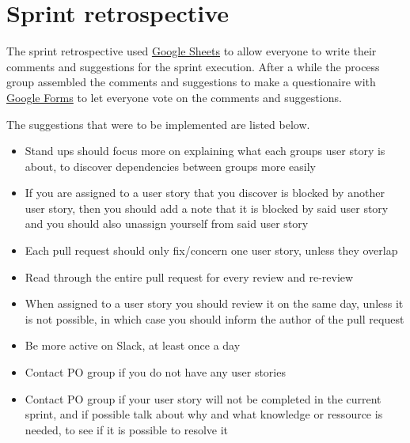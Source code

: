 \section{Sprint retrospective}
The sprint retrospective used \href{https://www.google.com/sheets/about/}{Google Sheets} to allow everyone to write their comments and suggestions for the sprint execution.
After a while the process group assembled the comments and suggestions to make a questionaire with \href{https://www.google.com/forms/about/}{Google Forms} to let everyone vote on the comments and suggestions.

The suggestions that were to be implemented are listed below.

\begin{itemize}
  \item Stand ups should focus more on explaining what each groups user story is about, to discover dependencies between groups more easily
  \item If you are assigned to a user story that you discover is blocked by another user story, then you should add a note that it is blocked by said user story and you should also unassign yourself from said user story
  \item Each pull request should only fix/concern one user story, unless they overlap
  \item Read through the entire pull request for every review and re-review
  \item When assigned to a user story you should review it on the same day, unless it is not possible, in which case you should inform the author of the pull request
  \item Be more active on Slack, at least once a day
  \item Contact PO group if you do not have any user stories
  \item Contact PO group if your user story will not be completed in the current sprint, and if possible talk about why and what knowledge or ressource is needed, to see if it is possible to resolve it
\end{itemize}


